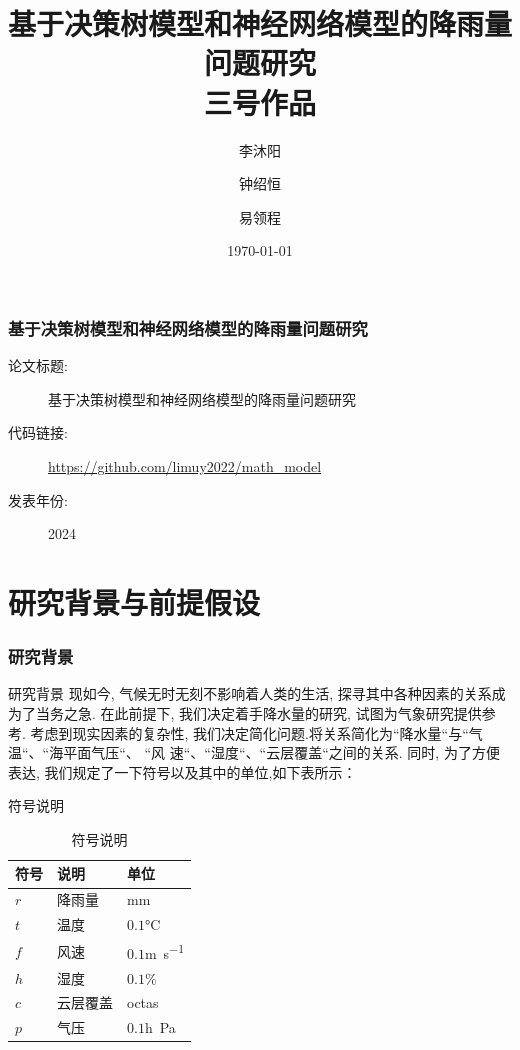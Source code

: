 \documentclass[10pt]{beamer}
\title[]{ {\Large 基于决策树模型和神经网络模型的降雨量问题研究 \\ \large 三号作品 }}
\author{李沐阳 \and 钟绍恒 \and 易领程}
\institute[VFU] {}
\date{\today} %
\begin{document}
{
\frame{\titlepage}
}





\begin{frame}
	\frametitle{基于决策树模型和神经网络模型的降雨量问题研究}

	\begin{description}
		\item[论文标题:]  基于决策树模型和神经网络模型的降雨量问题研究
		\item[代码链接:]   \url{https://github.com/limuy2022/math_model}
		\item[发表年份:]   2024
	\end{description}
\end{frame}


\section{研究背景与前提假设}
\begin{frame}
	\frametitle{研究背景}
	\begin{block}{研究背景}
		现如今, 气候无时无刻不影响着人类的生活, 探寻其中各种因素的关系成为了当务之急.
		在此前提下, 我们决定着手降水量的研究, 试图为气象研究提供参考.
		考虑到现实因素的复杂性, 我们决定简化问题.将关系简化为``降水量``与``气温``、``海平面气压``、 ``风
		速``、``湿度``、``云层覆盖``之间的关系.
		同时, 为了方便表达, 我们规定了一下符号以及其中的单位,如下表所示：
	\end{block}
	\begin{block}{符号说明}
		\begin{table}[h!]
			\centering
			\caption{符号说明}
			\begin{tabular}{p{6em}p{6em}l}
				\hline
				符号  & 说明   & 单位                          \\
				\hline
				$r$ & 降雨量  & \si{\milli\meter}           \\
				$t$ & 温度   & $0.1$\si{\degreeCelsius}    \\
				$f$ & 风速   & $0.1$\si{\meter\per\second} \\
				$h$ & 湿度   & $0.1\%$                     \\
				$c$ & 云层覆盖 & \si{octas}                  \\
				$p$ & 气压   & $0.1$\si{h\pascal}          \\
				\hline
			\end{tabular}
		\end{table}
	\end{block}
\end{frame}
\end{document}
